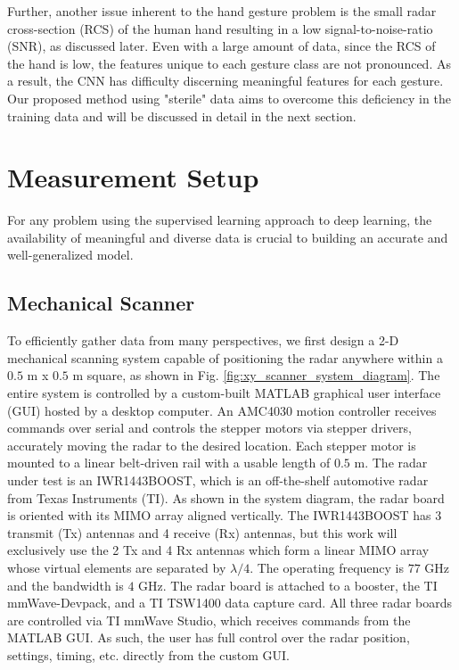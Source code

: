 \documentclass{ieeeaccess}
\begin{document}
Further, another issue inherent to the hand gesture problem is the small radar cross-section (RCS) of the human hand resulting in a low signal-to-noise-ratio (SNR), as discussed later. Even with a large amount of data, since the RCS of the hand is low, the features unique to each gesture class are not pronounced. As a result, the CNN has difficulty discerning meaningful features for each gesture. Our proposed method using "sterile" data aims to overcome this deficiency in the training data and will be discussed in detail in the next section.

\section{Measurement Setup}
\label{sec:measurement_setup}
For any problem using the supervised learning approach to deep learning, the availability of meaningful and diverse data is crucial to building an accurate and well-generalized model. 

\subsection{Mechanical Scanner}
\label{subsec:mechanical_scanner}
To efficiently gather data from many perspectives, we first design a 2-D mechanical scanning system capable of positioning the radar anywhere within a $0.5$ m x $0.5$ m square, as shown in Fig. \ref{fig:xy_scanner_system_diagram}. The entire system is controlled by a custom-built MATLAB graphical user interface (GUI) hosted by a desktop computer. An AMC4030 motion controller receives commands over serial and controls the stepper motors via stepper drivers, accurately moving the radar to the desired location. Each stepper motor is mounted to a linear belt-driven rail with a usable length of $0.5$ m. The radar under test is an IWR1443BOOST, which is an off-the-shelf automotive radar from Texas Instruments (TI). As shown in the system diagram, the radar board is oriented with its MIMO array aligned vertically. The IWR1443BOOST has 3 transmit (Tx) antennas and 4 receive (Rx) antennas, but this work will exclusively use the 2 Tx and 4 Rx antennas which form a linear MIMO array whose virtual elements are separated by $\lambda/4$. The operating frequency is $77$ GHz and the bandwidth is $4$ GHz. The radar board is attached to a booster, the TI mmWave-Devpack, and a TI TSW1400 data capture card. All three radar boards are controlled via TI mmWave Studio, which receives commands from the MATLAB GUI. As such, the user has full control over the radar position, settings, timing, etc. directly from the custom GUI. 
\end{document}
